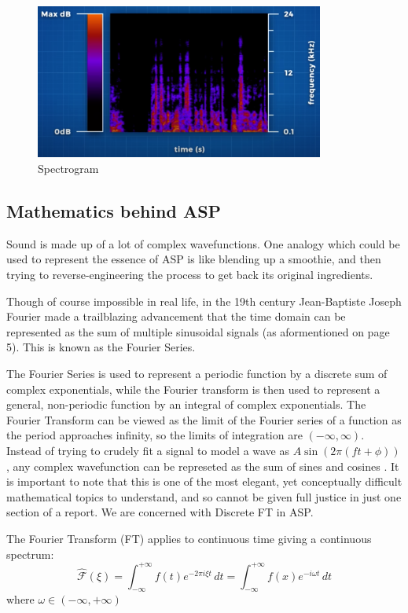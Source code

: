 \documentclass[a4paper,12pt]{article}
\begin{document}
\begin{figure}[h!]
    \centering
    \includegraphics[width=9.5cm]{spectrogram.png}
    \caption{Spectrogram \parencite{RealEngineeringYT}}
\end{figure}

\newpage
\subsection{Mathematics behind ASP}
Sound is made up of a lot of complex wavefunctions. One analogy which could be used to represent the essence of ASP is like blending up a smoothie, and then
trying to reverse-engineering the process to get back its original ingredients. 
\newline

Though of course impossible in real life, in the 19th century Jean-Baptiste Joseph Fourier made a trailblazing advancement that the time domain can be represented
as the sum of multiple sinusoidal signals (as aformentioned on page 5). This is known as the Fourier Series.
\newline

The Fourier Series is used to represent a periodic function by a discrete sum of complex exponentials, while the Fourier transform is then used to represent a general,
non-periodic function by an integral of complex exponentials. The Fourier Transform can be viewed as the limit of the Fourier series of a function as the period approaches infinity, so the limits of integration are $(-\infty, \infty)$.
Instead of trying to crudely fit a signal to model a wave as $A\sin(2\pi(ft + \phi))$, any complex wavefunction can be represeted as the sum of sines and cosines \parencite{3Blue1Brown}. It is important to note that this is one of the most elegant, yet conceptually difficult mathematical topics to understand,
and so cannot be given full justice in just one section of a report. We are concerned with Discrete FT in ASP.

\noindent The Fourier Transform (FT) applies to continuous time giving a continuous spectrum:
\LARGE
\[ \hat{\mathcal{F}}(\xi) = \int_{-\infty}^{+\infty} f(t)e^{-2  \pi  i \xi t} \,dt = \int_{-\infty}^{+\infty} f(x)e^{-i \omega t} \,dt \] \normalsize where $\omega \in (-\infty, +\infty)$ 
\end{document}
